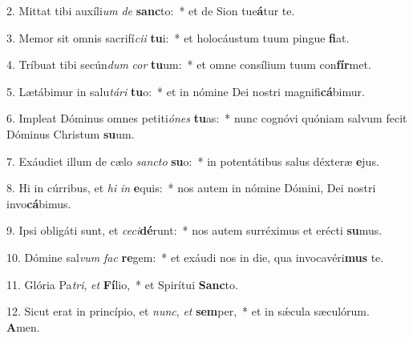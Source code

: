 2. Mittat tibi auxíli\textit{um} \textit{de} \textbf{sanc}to:~*  et de Sion tue\textbf{á}tur te.\

3. Memor sit omnis sacrifí\textit{ci}\textit{i} \textbf{tu}i:~*  et holocáustum tuum pingue \textbf{fi}at.\

4. Tríbuat tibi secún\textit{dum} \textit{cor} \textbf{tu}um:~*  et omne consílium tuum con\textbf{fír}met.\

5. Lætábimur in salu\textit{tá}\textit{ri} \textbf{tu}o:~*  et in nómine Dei nostri magnifi\textbf{cá}bimur.\

6. Impleat Dóminus omnes petiti\textit{ó}\textit{nes} \textbf{tu}as:~*  nunc cognóvi quóniam salvum fecit Dóminus Christum \textbf{su}um.\

7. Exáudiet illum de cælo \textit{sanc}\textit{to} \textbf{su}o:~*  in potentátibus salus déxteræ \textbf{e}jus.\

8. Hi in cúrribus, et \textit{hi} \textit{in} \textbf{e}quis:~*  nos autem in nómine Dómini, Dei nostri invo\textbf{cá}bimus.\

9. Ipsi obligáti sunt, et \textit{ce}\textit{ci}\textbf{dé}runt:~*  nos autem surréximus et erécti \textbf{su}mus.\

10. Dómine sal\textit{vum} \textit{fac} \textbf{re}gem:~*  et exáudi nos in die, qua invocavéri\textbf{mus} te.\

11. Glória Pa\textit{tri}, \textit{et} \textbf{Fí}lio,~*  et Spirítui \textbf{Sanc}to.\

12. Sicut erat in princípio, et \textit{nunc}, \textit{et} \textbf{sem}per,~*  et in sǽcula sæculórum. \textbf{A}men.\

